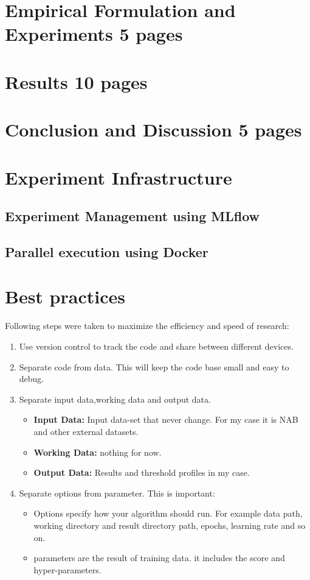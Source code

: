 \documentclass[12pt]{article}
\begin{document}
\newpage 
\section{Empirical Formulation and Experiments 5 pages}
\newpage
\section{Results 10 pages}
\newpage
\section{Conclusion and Discussion 5 pages}
\newpage
\section{Experiment Infrastructure}
\newpage
\subsection{Experiment Management using MLflow}
\newpage
\subsection{Parallel execution using Docker}
\newpage
\section{Best practices}
Following steps were taken to maximize the efficiency and speed of research:
\begin{enumerate}
	\item Use version control to track the code and share between different devices.
	\item Separate code from data. This will keep the code base small and easy to debug.
	\item Separate input data,working data and output data.
	\begin{itemize}
		\item \textbf{Input Data:} Input data-set that never change. For my case it is NAB and other external datasets.
		\item \textbf{Working Data:} nothing for now.
		\item \textbf{Output Data:} Results and threshold profiles in my case. 
	\end{itemize}
	\item Separate options from parameter. This is important:
 	\begin{itemize}
 		\item Options specify how your algorithm should run. For example data path, working directory and result directory path, epochs, learning rate and so on.
 		\item parameters are the result of training data. it includes the score and hyper-parameters. 
 	\end{itemize}
	
\end{enumerate}
\newpage
\end{document}
